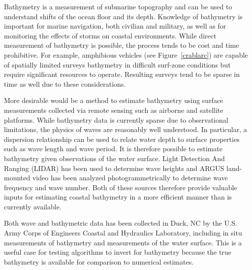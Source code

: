 Bathymetry is a measurement of submarine topography and can be used to understand shifts of the ocean floor and its depth. Knowledge of bathymetry is important for marine navigation, both civilian and military, as well as for monitoring the effects of storms on coastal environments. While direct measurement of bathymetry is possible, the process tends to be cost and time prohibitive. For example, amphibious vehicles (see Figure~\ref{crablarc}) are capable of spatially limited surveys bathymetry in difficult surf-zone conditions but require significant resources to operate. Resulting surveys tend to be sparse in time as well due to these considerations. 

More desirable would be a method to estimate bathymetry using surface measurements collected via remote sensing such as airborne and satellite platforms. While bathymetry data is currently sparse due to observational limitations, the physics of waves are reasonably well understood. In particular, a dispersion relationship can be used to relate water depth to surface properties such as wave length and wave period. It is therefore possible to estimate bathymetry given observations of the water surface. Light Detection And Ranging (LIDAR) has been used to determine wave heights and ARGUS land-mounted video has been analyzed photogrammetrically to determine wave frequency and wave number. Both of these sources therefore provide valuable inputs for estimating coastal bathymetry in a more efficient manner than is currently available.


Both wave and bathymetric data has been collected in Duck, NC by the U.S. Army Corps of Engineers Coastal and Hydraulics Laboratory, including in situ measurements of bathymetry and measurements of the water surface. This is a useful case for testing algorithms to invert for bathymetry because the true bathymetry is available for comparison to numerical estimates.
